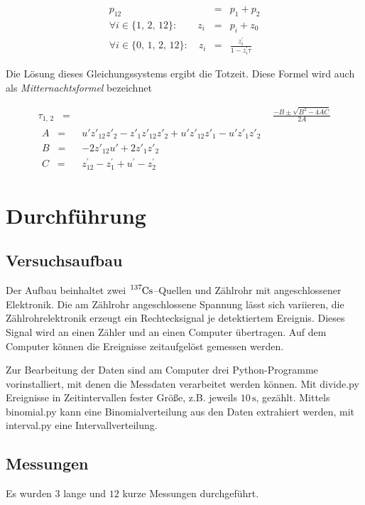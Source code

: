 \documentclass[12pt,a4paper]{scrartcl}
\numberwithin{equation}{section} %
\newcommand{\eqspaced}{\ensuremath{\;\;=\;\;}} %
\newcommand{\code}[1]{\textsf{#1}}
\begin{document}
\begin{eqnarray}
	p_{12} &=& p_1 + p_2 \\
	\forall i\in\{1,\,2,\,12\}:\qquad
		z_i &=& p_i + z_0 \\
	\forall i\in\{0,\,1,\,2,\,12\}:\quad
		z_i &=& \frac{z^\prime_i}{1-z^\prime_i \tau}
\end{eqnarray}

\noindent
Die Lösung dieses Gleichungssystems ergibt die Totzeit. Diese Formel wird auch als \emph{Mitternachtsformel} bezeichnet

\begin{align}
	\tau _{1,\,2} \eqspaced& \frac{-B \pm \sqrt{B^2 - 4AC}}{2A} \label{eq:Totzeit Mitternachtsformel} \\
	\begin{split}
		A \eqspaced& u'z'_{12}z'_2 - z'_1z'_12z'_2 + u'z'_{12}z'_1 - u'z'_1z'_2 \\
		B \eqspaced& -2z'_{12}u' + 2z'_1z'_2 \\
		C \eqspaced& z^\prime _{12} - z^\prime _1 + u^\prime  - z^\prime _2
	\end{split}
\end{align}

\clearpage
\hypertarget{durchfuxfchrung}{%
\section{Durchführung}\label{durchfuxfchrung}}
\subsection{Versuchsaufbau}
Der Aufbau beinhaltet zwei $\ce{^{137}Cs}$--Quellen und Zählrohr mit angeschlossener Elektronik. Die am Zählrohr angeschlossene Spannung lässt sich variieren, die Zählrohrelektronik erzeugt ein Rechtecksignal je detektiertem Ereignis. Dieses Signal wird an einen Zähler und an einen Computer übertragen. Auf dem Computer können die Ereignisse zeitaufgelöst gemessen werden.

Zur Bearbeitung der Daten sind am Computer drei Python-Programme vorinstalliert, mit denen die Messdaten verarbeitet werden können. Mit \code{divide.py} Ereignisse in Zeitintervallen fester Größe, z.B.  jeweils $10\mathrm{\,s}$, gezählt. Mittels \code{binomial.py} kann eine Binomialverteilung aus den Daten extrahiert werden, mit \code{interval.py} eine Intervallverteilung.

\subsection{Messungen}
Es wurden $3$ lange und $12$ kurze Messungen durchgeführt.
\end{document}
